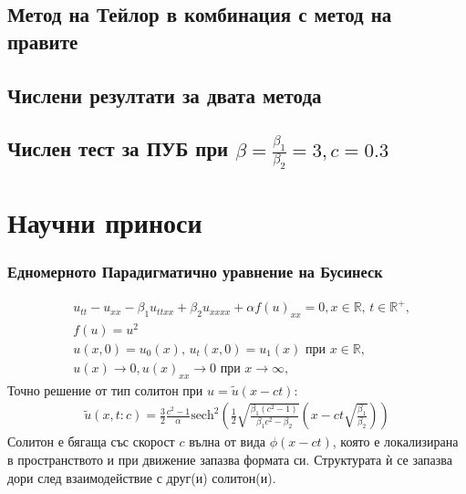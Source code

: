 \documentclass{beamer}
\newcommand{\RR}{\mathbb{R}}
\begin{document}
\begin{frame}
\subsection{Метод на Тейлор в комбинация с метод на правите}
\subsection{Числени резултати за двата метода}
\subsection{Числен тест за ПУБ при $\beta = \frac{\beta_1}{\beta_2} = 3, c=0.3$}
\section{Научни приноси}
\end{frame}

\begin{frame}
\frametitle{ Едномерното Парадигматично уравнение на Бусинеск }
\begin{align}
&u_{tt} - u_{xx} -\beta_1  u_{ttxx} +\beta_2 u_{xxxx} + \alpha f(u)_{xx}=0, x \in \RR, \, t\in\RR^+,\label{eq1D}
\\
&f(u) =  u^2 \nonumber 
\\ \nonumber &u(x,0)=u_0(x), \, u_t(x,0)=u_1(x)   \text{ при } x \in \RR,
\\  &u(x) \rightarrow 0,  u(x)_{xx} \rightarrow 0  \text{ при } x \rightarrow \infty, \label{eq1d1}
\end{align}
Точно решение от тип солитон при $u =\tilde u(x-ct)$:
\begin{align}
\tilde u(x,t:c) = \frac{3}{2} \frac{c^2-1}{\alpha}\text{sech}^2 \left( \frac{1}{2}  \sqrt{ \frac{\beta_1 (c^2-1)}{\beta_1 c^2-\beta_2}} (x-c t \sqrt{\frac{\beta_1}{\beta_2}} ) \right)
\end{align}
Солитон е бягаща със скорост $c$ вълна от вида $\phi(x-ct)$, която е локализирана в пространството и при движение запазва формата си. Структурата ѝ се запазва дори след взаимодействие с друг(и) солитон(и).
\end{frame}
\end{document}
